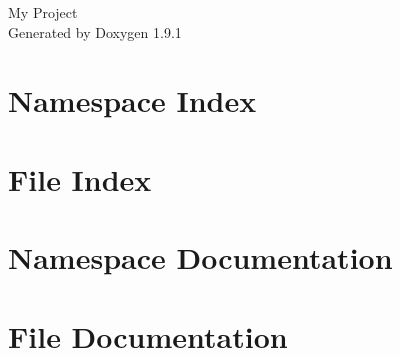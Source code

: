 \let\mypdfximage\pdfximage\def\pdfximage{\immediate\mypdfximage}\documentclass[twoside]{book}
\newcommand{\+}{\discretionary{\mbox{\scriptsize$\hookleftarrow$}}{}{}}
\newcommand{\clearemptydoublepage}{%
  \newpage{\pagestyle{empty}\cleardoublepage}%
}
\begin{document}
\raggedbottom

\hypersetup{pageanchor=false,
             bookmarksnumbered=true,
             pdfencoding=unicode
            }
\begin{titlepage}
\vspace*{7cm}
\begin{center}%
{\Large My Project }\\
\vspace*{1cm}
{\large Generated by Doxygen 1.9.1}\\
\end{center}
\end{titlepage}
\clearemptydoublepage
{}
\tableofcontents
\clearemptydoublepage
{}
\hypersetup{pageanchor=true}

\chapter{Namespace Index}

\chapter{File Index}

\chapter{Namespace Documentation}






\chapter{File Documentation}







\backmatter
\newpage
{}
\clearemptydoublepage
{}
\printindex
\end{document}
